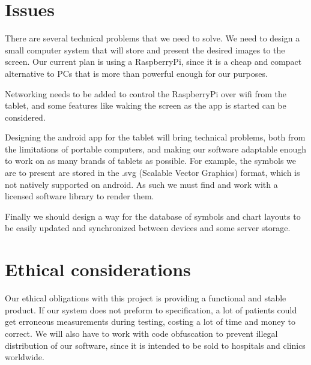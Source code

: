 \documentclass[12pt,a4paper,notitlepage]{report}
\begin{document}





\section{Issues}

There are several technical problems that we need to solve. We need to design a small computer system that will store and present the desired images to the screen. Our current plan is using a RaspberryPi, since it is a cheap and compact alternative to PCs that is more than powerful enough for our purposes. 

Networking needs to be added to control the RaspberryPi over wifi from the tablet, and some features like waking the screen as the app is started can be considered.

Designing the android app for the tablet will bring technical problems, both from the limitations of portable computers, and making our software adaptable enough to work on as many brands of tablets as possible. For example, the symbols we are to present are stored in the .svg (Scalable Vector Graphics) format, which is not natively supported on android. As such we must find and work with a licensed software library to render them. 

Finally we should design a way for the database of symbols and chart layouts to be easily updated and synchronized between devices and some server storage. 

\section{Ethical considerations}

Our ethical obligations with this project is providing a functional and stable product. If our system does not preform to specification, a lot of patients could get erroneous measurements during testing, costing a lot of time and money to correct. We will also have to work with code obfuscation to prevent illegal distribution of our software, since it is intended to be sold to hospitals and clinics worldwide.
\end{document}
